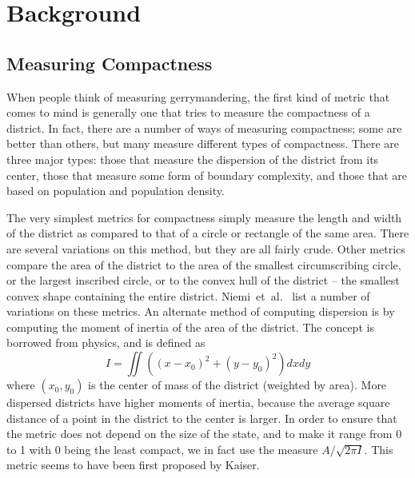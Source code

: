 \documentclass[12pt]{article}
\begin{document}
  \section{Background}\label{s:background}
  
  \subsection{Measuring Compactness}

  When people think of measuring gerrymandering, the first kind of metric that comes to mind is generally one that tries to measure the compactness of a district.  In fact, there are a number of ways of measuring compactness; some are better than others, but many measure different types of compactness.  There are three major types: those that measure the dispersion of the district from its center, those that measure some form of boundary complexity, and those that are based on population and population density.

  The very simplest metrics for compactness simply measure the length and width of the district as compared to that of a circle or rectangle of the same area.  There are several variations on this method, but they are all fairly crude.  Other metrics compare the area of the district to the area of the smallest circumscribing circle, or the largest inscribed circle, or to the convex hull of the district -- the smallest convex shape containing the entire district.  Niemi~et~al.~\cite{niemi} list a number of variations on these metrics.  An alternate method of computing dispersion is by computing the moment of inertia of the area of the district.  The concept is borrowed from physics, and is defined as
  \[I = \iint ((x-x_0)^2 + (y-y_0)^2) dx dy \]
  where $(x_0, y_0)$ is the center of mass of the district (weighted by area).  More dispersed districts have higher moments of inertia, because the average square distance of a point in the district to the center is larger.  In order to ensure that the metric does not depend on the size of the state, and to make it range from 0 to 1 with 0 being the least compact, we in fact use the measure $A/\sqrt{2\pi I}$.  This metric seems to have been first proposed by Kaiser.~\cite{kaiser}
\end{document}
